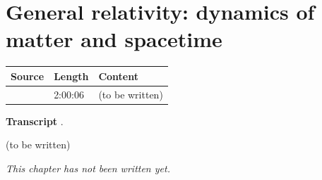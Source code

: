 \chapter{General relativity: dynamics of matter and spacetime}\label{ch:c23}
\begin{paracol}{2}

\begin{sources}
\begin{tabularx}{\linewidth}{@{}l l L@{}}
\toprule
\textbf{Source} & \textbf{Length} & \textbf{Content}\\
\midrule
{} & 2:00:06 & (to be written)\\
\bottomrule
\end{tabularx}

\smallskip
\textbf{Transcript} .
\end{sources}

\begin{reading}
(to be written)
\end{reading}

\emph{This chapter has not been written yet.}

\flushside
\end{paracol}
